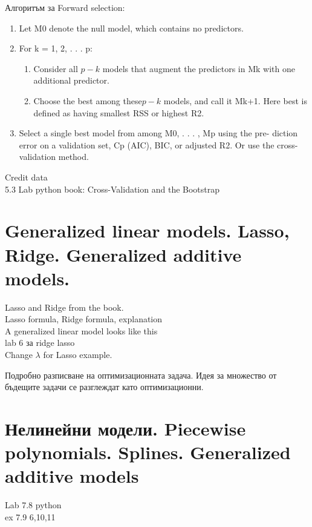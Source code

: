\documentclass{article}
\begin{document}
	Алгоритъм за Forward selection: 
	\begin{enumerate}
				\item Let M0 denote the null model, which contains no predictors.
		\item For k = 1, 2, . . . p: 
		\begin{enumerate}
			\item Consider all $p-k$   models that augment the predictors in Mk
			with one additional predictor.
			\item Choose the best among these$p-k$    models, and call it Mk+1.
			Here best is defined as having smallest RSS or highest R2.
		\end{enumerate}
		\item Select a single best model from among M0, . . . , Mp using the pre-
		diction error on a validation set, Cp (AIC), BIC, or adjusted R2. Or
		use the cross-validation method.
	\end{enumerate}
	
	
	Credit data\\
	
	5.3 Lab python book: Cross-Validation and the Bootstrap \\
	
\newpage
\section{Generalized linear models. Lasso, Ridge. Generalized additive models. }



	Lasso and Ridge from the book.\\
	Lasso formula, Ridge formula, explanation \\
	
	
	A generalized linear model looks like this\\
	lab 6 за ridge lasso \\
	Change $\lambda$ for Lasso example.
	
	
	
	Подробно разписване на оптимизационната задача. Идея за множество от бъдещите задачи
	се разглеждат като оптимизационни.
	
\newpage	
\section{Нелинейни модели. Piecewise polynomials. Splines. Generalized additive models }
Lab 7.8 python \\
ex 7.9 6,10,11
	
\end{document}

